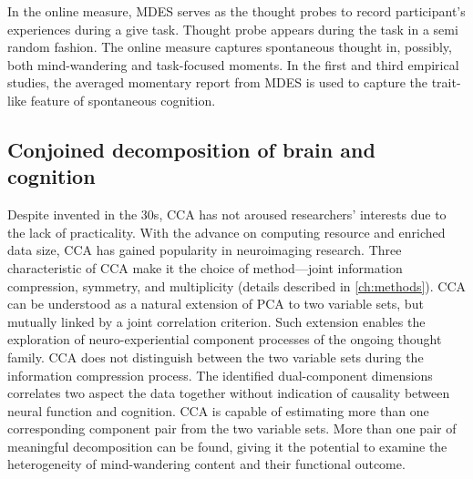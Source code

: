 In the online measure, MDES serves as the thought probes to record participant's experiences during a give task. Thought probe appears during the task in a semi random fashion. The online measure captures spontaneous thought in, possibly, both mind-wandering and task-focused moments. In the first and third empirical studies, the averaged momentary report from MDES is used to capture the trait-like feature of spontaneous cognition.


\subsection{Conjoined decomposition of brain and cognition}

Despite invented in the 30s, CCA has not aroused researchers’ interests due to the lack of practicality. With the advance on computing resource and enriched data size, CCA has gained popularity in neuroimaging research. Three characteristic of CCA make it the choice of method---joint information compression, symmetry, and multiplicity (details described in \cref{ch:methods}). CCA can be understood as a natural extension of PCA to two variable sets, but mutually linked by a joint correlation criterion. Such extension enables the exploration of neuro-experiential component processes of the ongoing thought family. CCA does not distinguish between the two variable sets during the information compression process. The identified dual-component dimensions correlates two aspect the data together without indication of causality between neural function and cognition. CCA is capable of estimating more than one corresponding component pair from the two variable sets. More than one pair of meaningful decomposition can be found, giving it the potential to examine the heterogeneity of mind-wandering content and their functional outcome. 

